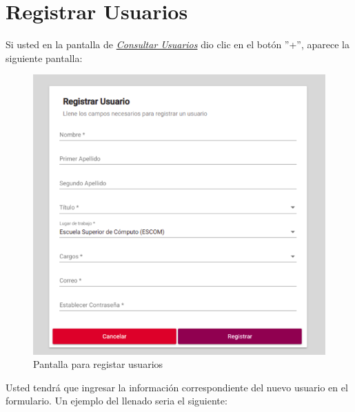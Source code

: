         

    \newpage
        \hypertarget{registrarUs}{}
        \section{Registrar Usuarios} 
            Si usted  en la pantalla de \hyperlink{consultarUs}{\textit{Consultar Usuarios}} dio clic en el botón ''+'', aparece la siguiente pantalla:
            
            \begin{figure}[!hbtp]
                \centering
                \hypertarget{registrarUs}{\includegraphics[width=0.7\linewidth]{images/SP5/Registro-Usuario-vacio}}
                \caption{Pantalla para registar usuarios}
                \label{registrarrh}
            \end{figure}
            
            Usted tendrá que ingresar la información correspondiente del nuevo usuario en el formulario. Un ejemplo del llenado seria el siguiente:
        
